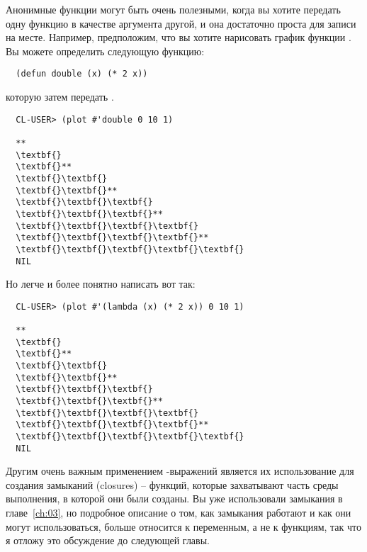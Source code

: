 Анонимные функции могут быть очень полезными, когда вы хотите передать одну функцию в
качестве аргумента другой, и она достаточно проста для записи на месте.  Например,
предположим, что вы хотите нарисовать график функции . Вы можете определить
следующую функцию:

\begin{lstlisting}
  (defun double (x) (* 2 x))
\end{lstlisting}

которую затем передать .

\begin{verbatim}
  CL-USER> (plot #'double 0 10 1)
  
  **
  \textbf{}
  \textbf{}**
  \textbf{}\textbf{}
  \textbf{}\textbf{}**
  \textbf{}\textbf{}\textbf{}
  \textbf{}\textbf{}\textbf{}**
  \textbf{}\textbf{}\textbf{}\textbf{}
  \textbf{}\textbf{}\textbf{}\textbf{}**
  \textbf{}\textbf{}\textbf{}\textbf{}\textbf{}
  NIL
\end{verbatim}

Но легче и более понятно написать вот так:

\begin{verbatim}
  CL-USER> (plot #'(lambda (x) (* 2 x)) 0 10 1)
  
  **
  \textbf{}
  \textbf{}**
  \textbf{}\textbf{}
  \textbf{}\textbf{}**
  \textbf{}\textbf{}\textbf{}
  \textbf{}\textbf{}\textbf{}**
  \textbf{}\textbf{}\textbf{}\textbf{}
  \textbf{}\textbf{}\textbf{}\textbf{}**
  \textbf{}\textbf{}\textbf{}\textbf{}\textbf{}
  NIL
\end{verbatim}

Другим очень важным применением -выражений является их использование для
создания замыканий (closures) -- функций, которые захватывают часть среды выполнения, в
которой они были созданы.  Вы уже использовали замыкания в главе~\ref{ch:03}, но подробное
описание о том, как замыкания работают и как они могут использоваться, больше относится к
переменным, а не к функциям, так что я отложу это обсуждение до следующей главы.

